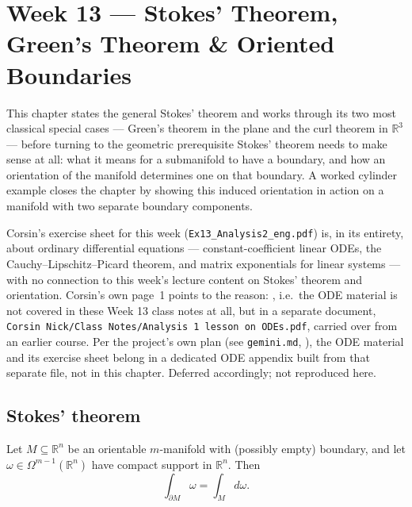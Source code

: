 \chapter{Week 13 --- Stokes' Theorem, Green's Theorem \& Oriented Boundaries}
\label{ch:week13}

This chapter states the general Stokes' theorem and works through its two most classical
special cases --- Green's theorem in the plane and the curl theorem in $\mathbb{R}^3$ ---
before turning to the geometric prerequisite Stokes' theorem needs to make sense at all:
what it means for a submanifold to have a boundary, and how an orientation of the manifold
determines one on that boundary. A worked cylinder example closes the chapter by showing this
induced orientation in action on a manifold with two separate boundary components.

\begin{ainote}
Corsin's exercise sheet for this week (\texttt{Ex13\_Analysis2\_eng.pdf}) is, in its entirety,
about ordinary differential equations --- constant-coefficient linear ODEs, the
Cauchy--Lipschitz--Picard theorem, and matrix exponentials for linear systems --- with no
connection to this week's lecture content on Stokes' theorem and orientation. Corsin's own
page~1 points to the reason: , i.e.\ the ODE material is not covered in these Week 13 class notes at all, but in a
separate document, \texttt{Corsin Nick/Class Notes/Analysis 1 lesson on ODEs.pdf}, carried
over from an earlier course. Per the project's own plan (see \texttt{gemini.md}, ), the ODE material and its exercise sheet belong in a
dedicated ODE appendix built from that separate file, not in this chapter. Deferred
accordingly; not reproduced here.
\end{ainote}

\section{Stokes' theorem}
\label{sec:stokes_general}

\begin{theorem}
\label{thm:stokes_general}
Let $M \subseteq \mathbb{R}^n$ be an orientable $m$-manifold with (possibly empty) boundary,
and let $\omega \in \Omega^{m-1}(\mathbb{R}^n)$ have compact support in $\mathbb{R}^n$. Then
\[\int_{\partial M} \omega = \int_M d\omega.\]
\end{theorem}

